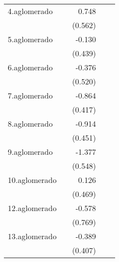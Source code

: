 {\begin{longtable}{l*{4}{D{.}{.}{-1}}}
\addlinespace
4.aglomerado&                     &       0.748         &                     &                     \\
            &                     &     (0.562)         &                     &                     \\
\addlinespace
5.aglomerado&                     &      -0.130         &                     &                     \\
            &                     &     (0.439)         &                     &                     \\
\addlinespace
6.aglomerado&                     &      -0.376         &                     &                     \\
            &                     &     (0.520)         &                     &                     \\
\addlinespace
7.aglomerado&                     &      -0.864\sym{*}  &                     &                     \\
            &                     &     (0.417)         &                     &                     \\
\addlinespace
8.aglomerado&                     &      -0.914\sym{*}  &                     &                     \\
            &                     &     (0.451)         &                     &                     \\
\addlinespace
9.aglomerado&                     &      -1.377\sym{*}  &                     &                     \\
            &                     &     (0.548)         &                     &                     \\
\addlinespace
10.aglomerado&                     &       0.126         &                     &                     \\
            &                     &     (0.469)         &                     &                     \\
\addlinespace
12.aglomerado&                     &      -0.578         &                     &                     \\
            &                     &     (0.769)         &                     &                     \\
\addlinespace
13.aglomerado&                     &      -0.389         &                     &                     \\
            &                     &     (0.407)         &                     &                     \\

\end{longtable}}
